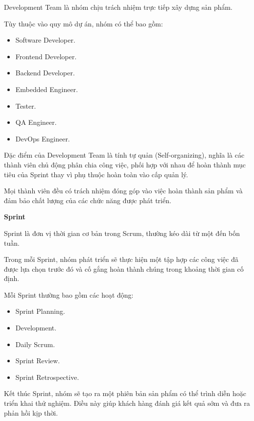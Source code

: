 \hspace{0.2cm}Development Team là nhóm chịu trách nhiệm trực tiếp xây dựng sản phẩm.

\hspace{0.2cm}Tùy thuộc vào quy mô dự án, nhóm có thể bao gồm:

\begin{itemize}
\item Software Developer.
\item Frontend Developer.
\item Backend Developer.
\item Embedded Engineer.
\item Tester.
\item QA Engineer.
\item DevOps Engineer.
\end{itemize}

\hspace{0.2cm}Đặc điểm của Development Team là tính tự quản (Self-organizing), nghĩa là các thành viên chủ động phân chia công việc, phối hợp với nhau để hoàn thành mục tiêu của Sprint thay vì phụ thuộc hoàn toàn vào cấp quản lý.

\hspace{0.2cm}Mọi thành viên đều có trách nhiệm đóng góp vào việc hoàn thành sản phẩm và đảm bảo chất lượng của các chức năng được phát triển.

\textbf{Sprint} 

\hspace{0.2cm}Sprint là đơn vị thời gian cơ bản trong Scrum, thường kéo dài từ một đến bốn tuần.

\hspace{0.2cm}Trong mỗi Sprint, nhóm phát triển sẽ thực hiện một tập hợp các công việc đã được lựa chọn trước đó và cố gắng hoàn thành chúng trong khoảng thời gian cố định.

\hspace{0.2cm}Mỗi Sprint thường bao gồm các hoạt động:

\begin{itemize}
\item Sprint Planning.
\item Development.
\item Daily Scrum.
\item Sprint Review.
\item Sprint Retrospective.
\end{itemize}

Kết thúc Sprint, nhóm sẽ tạo ra một phiên bản sản phẩm có thể trình diễn hoặc triển khai thử nghiệm. Điều này giúp khách hàng đánh giá kết quả sớm và đưa ra phản hồi kịp thời.

